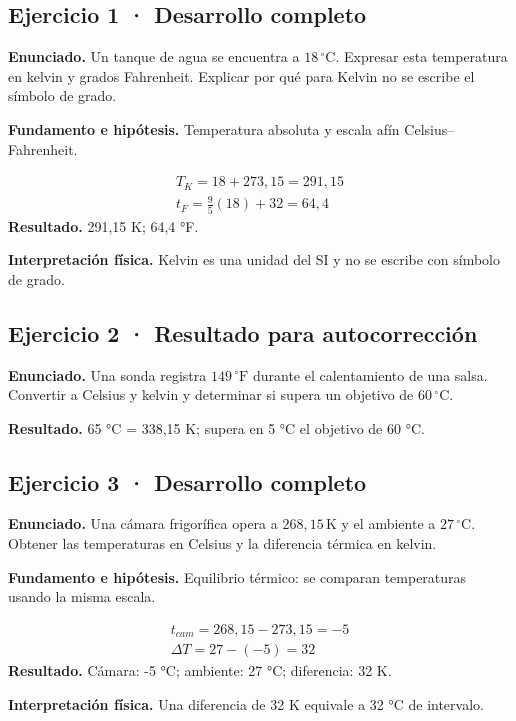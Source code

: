 \documentclass[11pt,a4paper]{article}
\begin{document}
\subsection*{Ejercicio 1 · Desarrollo completo}
\textbf{Enunciado.} Un tanque de agua se encuentra a \(18\,^\circ\mathrm C\). Expresar esta temperatura en kelvin y grados Fahrenheit. Explicar por qué para Kelvin no se escribe el símbolo de grado.

\textbf{Fundamento e hipótesis.} Temperatura absoluta y escala afín Celsius--Fahrenheit.

\[
\begin{gathered}
T_K=18+273{,}15=291{,}15\\t_F=\frac95(18)+32=64{,}4
\end{gathered}
\]
\textbf{Resultado.} 291,15 K; 64,4 °F.

\textbf{Interpretación física.} Kelvin es una unidad del SI y no se escribe con símbolo de grado.


\subsection*{Ejercicio 2 · Resultado para autocorrección}
\textbf{Enunciado.} Una sonda registra \(149\,^\circ\mathrm F\) durante el calentamiento de una salsa. Convertir a Celsius y kelvin y determinar si supera un objetivo de \(60\,^\circ\mathrm C\).

\textbf{Resultado.} 65 °C = 338,15 K; supera en 5 °C el objetivo de 60 °C.


\subsection*{Ejercicio 3 · Desarrollo completo}
\textbf{Enunciado.} Una cámara frigorífica opera a \(268{,}15\,\mathrm K\) y el ambiente a \(27\,^\circ\mathrm C\). Obtener las temperaturas en Celsius y la diferencia térmica en kelvin.

\textbf{Fundamento e hipótesis.} Equilibrio térmico: se comparan temperaturas usando la misma escala.

\[
\begin{gathered}
t_{cam}=268{,}15-273{,}15=-5\\\Delta T=27-(-5)=32
\end{gathered}
\]
\textbf{Resultado.} Cámara: -5 °C; ambiente: 27 °C; diferencia: 32 K.

\textbf{Interpretación física.} Una diferencia de 32 K equivale a 32 °C de intervalo.
\end{document}
